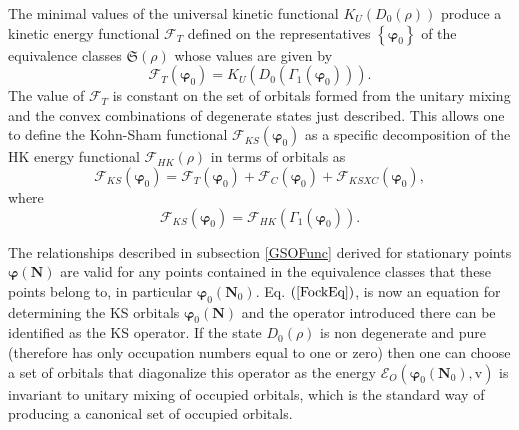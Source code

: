 \documentclass[aps,preprint]{revtex4}%
\begin{document}
The minimal values of the universal kinetic functional $K_{U}\left(
D_{0}\left(  \rho\right)  \right)  $ produce a kinetic energy functional
$\mathcal{F}_{T}$ defined on the representatives $\left\{  \boldsymbol{\varphi
}_{0}\right\}  $ of the equivalence classes $\mathfrak{S}\left(  \rho\right)
$ whose values are given by
\begin{equation}
\mathcal{F}_{T}\left(  \boldsymbol{\varphi}_{0}\right)  =K_{U}\left(
D_{0}\left(  \Gamma_{1}\left(  \boldsymbol{\varphi}_{0}\right)  \right)
\right)  .\label{KEFunc}%
\end{equation}
The value of $\mathcal{F}_{T}$ is constant on the set of orbitals formed from
the unitary mixing and the convex combinations of degenerate states just
described. This allows one to define the Kohn-Sham functional $\mathcal{F}%
_{KS}\left(  \boldsymbol{\varphi}_{0}\right)  $ as a specific decomposition of
the HK energy functional $\mathcal{F}_{HK}\left(  \rho\right)  $ in terms of
orbitals as
\begin{equation}
\mathcal{F}_{KS}\left(  \boldsymbol{\varphi}_{0}\right)  =\mathcal{F}%
_{T}\left(  \boldsymbol{\varphi}_{0}\right)  +\mathcal{F}_{C}\left(
\boldsymbol{\varphi}_{0}\right)  +\mathcal{F}_{KSXC}\left(
\boldsymbol{\varphi}_{0}\right)  ,
\end{equation}
where
\begin{equation}
\mathcal{F}_{KS}\left(  \boldsymbol{\varphi}_{0}\right)  =\mathcal{F}%
_{HK}\left(  \Gamma_{1}\left(  \boldsymbol{\varphi}_{0}\right)  \right)  .
\end{equation}


The relationships described in subsection \ref{GSOFunc} derived for stationary
points $\boldsymbol{\varphi}\left(  \boldsymbol{N}\right)  $ are valid for any
points contained in the equivalence classes that these points belong to, in
particular $\boldsymbol{\varphi}_{0}\left(  \boldsymbol{\boldsymbol{N}}%
_{0}\right)  $. Eq. $\left(  \ref{FockEq}\right)  $, is now an equation for
determining the KS orbitals $\boldsymbol{\varphi}_{0}\left(  \boldsymbol{N}%
\right)  $ and the operator introduced there can be identified as the KS
operator. If the state $D_{0}\left(  \rho\right)  $ is non degenerate and pure
(therefore has only occupation numbers equal to one or zero) then one can
choose a set of orbitals that diagonalize this operator as the energy
$\mathcal{E}_{O}\left(  \boldsymbol{\varphi}_{0}\left(  \boldsymbol{N}%
_{0}\right)  ,\mathrm{v}\right)  $ is invariant to unitary mixing of occupied
orbitals, which is the standard way of producing a canonical set of occupied orbitals.
\end{document}
